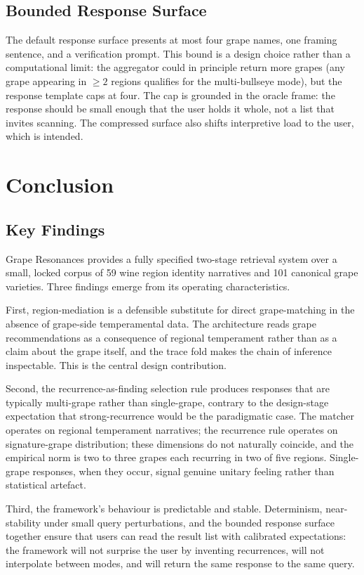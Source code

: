 \documentclass[11pt]{article}
\begin{document}
\subsection{Bounded Response Surface}
The default response surface presents at most four grape names, one framing sentence, and a verification prompt. This bound is a design choice rather than a computational limit: the aggregator could in principle return more grapes (any grape appearing in $\geq 2$ regions qualifies for the multi-bullseye mode), but the response template caps at four. The cap is grounded in the oracle frame: the response should be small enough that the user holds it whole, not a list that invites scanning. The compressed surface also shifts interpretive load to the user, which is intended.

\section{Conclusion}

\subsection{Key Findings}
Grape Resonances provides a fully specified two-stage retrieval system over a small, locked corpus of 59 wine region identity narratives and 101 canonical grape varieties. Three findings emerge from its operating characteristics.

First, region-mediation is a defensible substitute for direct grape-matching in the absence of grape-side temperamental data. The architecture reads grape recommendations as a consequence of regional temperament rather than as a claim about the grape itself, and the trace fold makes the chain of inference inspectable. This is the central design contribution.

Second, the recurrence-as-finding selection rule produces responses that are typically multi-grape rather than single-grape, contrary to the design-stage expectation that strong-recurrence would be the paradigmatic case. The matcher operates on regional temperament narratives; the recurrence rule operates on signature-grape distribution; these dimensions do not naturally coincide, and the empirical norm is two to three grapes each recurring in two of five regions. Single-grape responses, when they occur, signal genuine unitary feeling rather than statistical artefact.

Third, the framework's behaviour is predictable and stable. Determinism, near-stability under small query perturbations, and the bounded response surface together ensure that users can read the result list with calibrated expectations: the framework will not surprise the user by inventing recurrences, will not interpolate between modes, and will return the same response to the same query.
\end{document}
